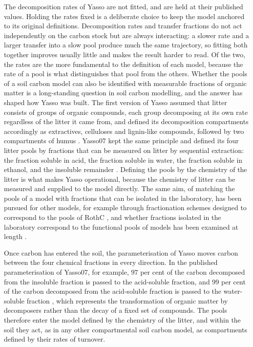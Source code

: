 \documentclass[11pt]{article}
\begin{document}
The decomposition
rates of Yasso are not fitted, and are held at their published values.
Holding the rates fixed is a deliberate choice to keep the model anchored to its original definitions.
Decomposition rates and transfer fractions do not act independently on the carbon
stock but are always interacting: a slower rate and a larger transfer into a slow pool produce much the same
trajectory, so fitting both together improves usually little and makes the result harder to read.
Of the two, the rates are the more fundamental to the definition of each model,
because the rate of a pool is what distinguishes that pool from the others. Whether
the pools of a soil carbon model can also be identified with measurable fractions of
organic matter is a long-standing question in soil carbon modelling, and the answer
has shaped how Yasso was built. The first version of Yasso assumed that litter
consists of groups of organic compounds, each group decomposing at its own rate
regardless of the litter it came from, and defined its decomposition compartments
accordingly as extractives, celluloses and lignin-like compounds, followed by two
compartments of humus \citep{Liski2005}. Yasso07 kept the same principle and defined
its four litter pools by fractions that can be measured on litter by sequential
extraction: the fraction soluble in acid, the fraction soluble in water, the fraction
soluble in ethanol, and the insoluble remainder \citep{Tuomi2009}. Defining the pools
by the chemistry of the litter is what makes Yasso operational, because the chemistry
of litter can be measured and supplied to the model directly. The same aim, of
matching the pools of a model with fractions that can be isolated in the laboratory,
has been pursued for other models, for example through fractionation schemes designed
to correspond to the pools of RothC \citep{Zimmermann2007}, and whether fractions
isolated in the laboratory correspond to the functional pools of models has been
examined at length \citep{vonLutzow2007}.

Once carbon has entered the soil, the parameterisation of Yasso moves carbon between
the four chemical fractions in every direction. In the published parameterisation of
Yasso07, for example, $97$ per cent of the carbon decomposed from the insoluble
fraction is passed to the acid-soluble fraction, and $99$ per cent of the carbon
decomposed from the acid-soluble fraction is passed to the water-soluble fraction
\citep{Tuomi2009}, which represents the transformation of organic matter by
decomposers rather than the decay of a fixed set of compounds. The pools therefore
enter the model defined by the chemistry of the litter, and within the soil they act,
as in any other compartmental soil carbon model, as compartments defined by their
rates of turnover.
\end{document}
